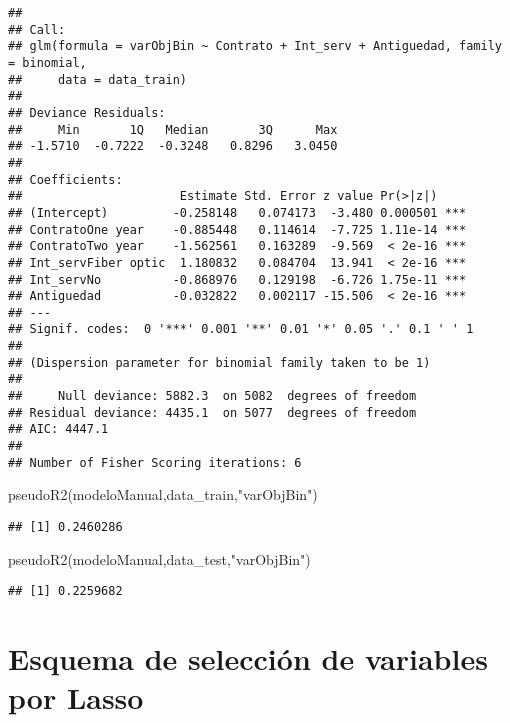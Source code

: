 \documentclass[
]{article}
\newenvironment{Shaded}{\begin{snugshade}}{\end{snugshade}}
\newcommand{\FunctionTok}[1]{\textcolor[rgb]{0.00,0.00,0.00}{#1}}
\newcommand{\NormalTok}[1]{#1}
\newcommand{\StringTok}[1]{\textcolor[rgb]{0.31,0.60,0.02}{#1}}
\begin{document}
\begin{verbatim}
## 
## Call:
## glm(formula = varObjBin ~ Contrato + Int_serv + Antiguedad, family = binomial, 
##     data = data_train)
## 
## Deviance Residuals: 
##     Min       1Q   Median       3Q      Max  
## -1.5710  -0.7222  -0.3248   0.8296   3.0450  
## 
## Coefficients:
##                      Estimate Std. Error z value Pr(>|z|)    
## (Intercept)         -0.258148   0.074173  -3.480 0.000501 ***
## ContratoOne year    -0.885448   0.114614  -7.725 1.11e-14 ***
## ContratoTwo year    -1.562561   0.163289  -9.569  < 2e-16 ***
## Int_servFiber optic  1.180832   0.084704  13.941  < 2e-16 ***
## Int_servNo          -0.868976   0.129198  -6.726 1.75e-11 ***
## Antiguedad          -0.032822   0.002117 -15.506  < 2e-16 ***
## ---
## Signif. codes:  0 '***' 0.001 '**' 0.01 '*' 0.05 '.' 0.1 ' ' 1
## 
## (Dispersion parameter for binomial family taken to be 1)
## 
##     Null deviance: 5882.3  on 5082  degrees of freedom
## Residual deviance: 4435.1  on 5077  degrees of freedom
## AIC: 4447.1
## 
## Number of Fisher Scoring iterations: 6
\end{verbatim}

\begin{Shaded}
\begin{Highlighting}[]
\FunctionTok{pseudoR2}\NormalTok{(modeloManual,data\_train,}\StringTok{"varObjBin"}\NormalTok{)}
\end{Highlighting}
\end{Shaded}

\begin{verbatim}
## [1] 0.2460286
\end{verbatim}

\begin{Shaded}
\begin{Highlighting}[]
\FunctionTok{pseudoR2}\NormalTok{(modeloManual,data\_test,}\StringTok{"varObjBin"}\NormalTok{)}
\end{Highlighting}
\end{Shaded}

\begin{verbatim}
## [1] 0.2259682
\end{verbatim}

\hypertarget{esquema-de-selecciuxf3n-de-variables-por-lasso}{%
\section{Esquema de selección de variables por
Lasso}\label{esquema-de-selecciuxf3n-de-variables-por-lasso}}
\end{document}
